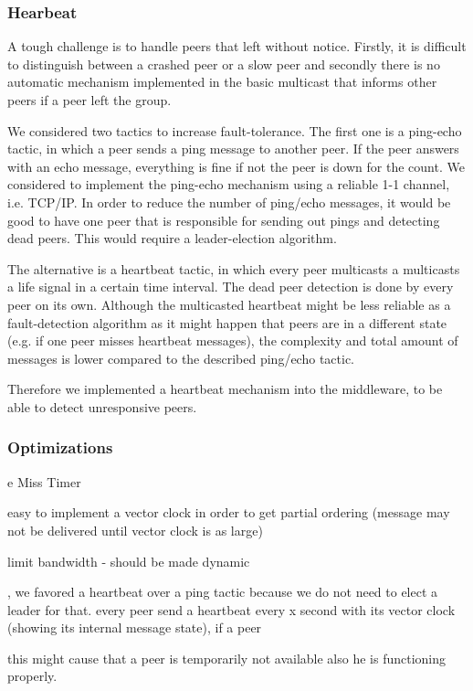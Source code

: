 \subsubsection{Hearbeat}
A tough challenge is to handle peers that left without notice. Firstly, it is difficult to distinguish between a crashed peer or a slow peer and  secondly there is no automatic mechanism implemented in the basic multicast that informs other peers if a peer left the group.

We considered two tactics to increase fault-tolerance. The first one is a ping-echo tactic, in which a peer sends a ping message to another peer. If the peer answers with an echo message, everything is fine if not the peer is down for the count. We considered to implement the ping-echo mechanism using a reliable 1-1 channel, i.e. TCP/IP. In order to reduce the number of ping/echo messages, it would be good to have one peer that is responsible for sending out pings and detecting dead peers. This would require a leader-election algorithm.

The alternative is a heartbeat tactic, in which every peer multicasts a multicasts a life signal in a certain time interval. The dead peer detection is done by every peer on its own. Although the multicasted heartbeat might be less reliable as a fault-detection algorithm as it might happen that peers are in a different state (e.g. if one peer misses heartbeat messages), the complexity and total amount of messages is lower compared to the described ping/echo tactic.

Therefore we implemented a heartbeat mechanism into the middleware, to be able to detect unresponsive peers.

\subsubsection{Optimizations}
e
Miss Timer

easy to implement a vector clock in order to get partial ordering  (message may not be delivered until vector clock is as large)

limit bandwidth 
    - should be made dynamic
    
    , we favored a heartbeat over a ping tactic because we do not need to elect a leader for that. 
       every peer send a heartbeat every x second with its vector clock (showing its internal message state), if a peer 

       this might cause that a peer is temporarily not available also he is functioning properly.

